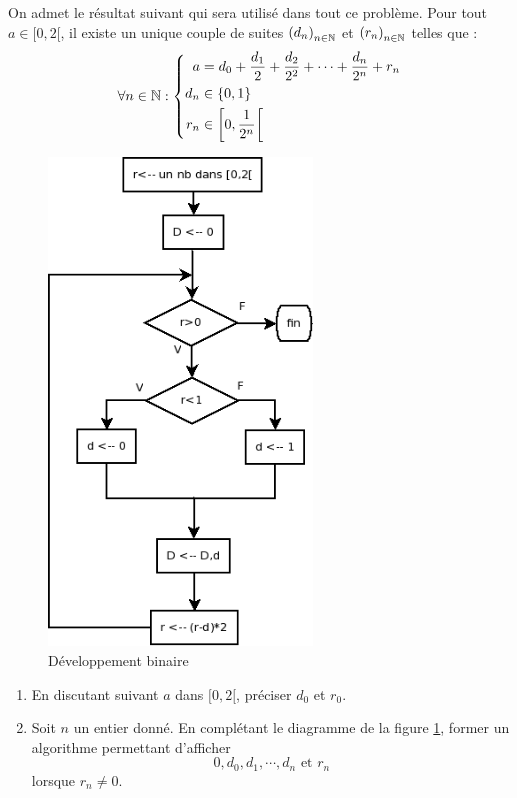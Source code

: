 On admet le résultat suivant qui sera utilisé dans tout ce problème.\newline
Pour tout $a\in[0,2[$, il existe un unique couple de suites $\left( d_n\right) _{n\in \mathbb{N}}$ et $\left( r_n\right) _{n\in \mathbb{N}}$ telles que :
\begin{displaymath}
 \forall n \in \mathbb{N} :
\left\lbrace 
\begin{aligned}
 a   &= d_0 + \frac{d_1}{2} + \frac{d_2}{2^2} + \cdots + \frac{d_n}{2^n} + r_n\\
 d_n &\in \{0,1\}\\
 r_n &\in \left[ 0, \frac{1}{2^n}\right[ 
\end{aligned}
\right. 
\end{displaymath}
\begin{figure}[htp]
 \centering
 \includegraphics[width=7cm]{Ebincos_1.png}
 \caption{Développement binaire}
 \label{fig:Ebincos_1}
\end{figure}
\begin{enumerate}
 \item En discutant suivant $a$ dans $[0,2[$, préciser $d_0$ et $r_0$.
 \item Soit $n$ un entier donné. En complétant le diagramme de la figure \ref{fig:Ebincos_1}, former un algorithme permettant d'afficher 
\begin{displaymath}
 0,d_0,d_1,\cdots,d_n \text{ et } r_n
\end{displaymath}
lorsque $r_n\neq 0$.
\end{enumerate}


